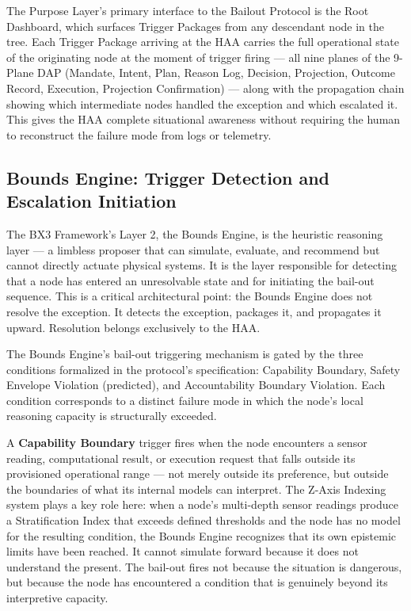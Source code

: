 The Purpose Layer's primary interface to the Bailout Protocol is the Root Dashboard, which surfaces Trigger Packages from any descendant node in the tree. Each Trigger Package arriving at the HAA carries the full operational state of the originating node at the moment of trigger firing — all nine planes of the 9-Plane DAP (Mandate, Intent, Plan, Reason Log, Decision, Projection, Outcome Record, Execution, Projection Confirmation) — along with the propagation chain showing which intermediate nodes handled the exception and which escalated it. This gives the HAA complete situational awareness without requiring the human to reconstruct the failure mode from logs or telemetry.

\subsection{Bounds Engine: Trigger Detection and Escalation Initiation}

The BX3 Framework's Layer 2, the Bounds Engine, is the heuristic reasoning layer — a limbless proposer that can simulate, evaluate, and recommend but cannot directly actuate physical systems. It is the layer responsible for detecting that a node has entered an unresolvable state and for initiating the bail-out sequence. This is a critical architectural point: the Bounds Engine does not resolve the exception. It detects the exception, packages it, and propagates it upward. Resolution belongs exclusively to the HAA.

The Bounds Engine's bail-out triggering mechanism is gated by the three conditions formalized in the protocol's specification: Capability Boundary, Safety Envelope Violation (predicted), and Accountability Boundary Violation. Each condition corresponds to a distinct failure mode in which the node's local reasoning capacity is structurally exceeded.

A \textbf{Capability Boundary} trigger fires when the node encounters a sensor reading, computational result, or execution request that falls outside its provisioned operational range — not merely outside its preference, but outside the boundaries of what its internal models can interpret. The Z-Axis Indexing system plays a key role here: when a node's multi-depth sensor readings produce a Stratification Index that exceeds defined thresholds and the node has no model for the resulting condition, the Bounds Engine recognizes that its own epistemic limits have been reached. It cannot simulate forward because it does not understand the present. The bail-out fires not because the situation is dangerous, but because the node has encountered a condition that is genuinely beyond its interpretive capacity.

